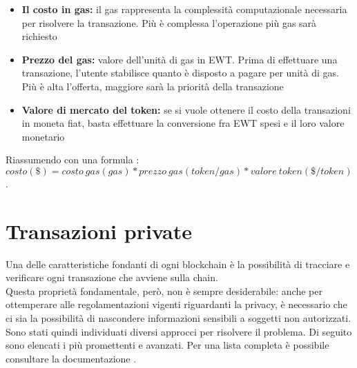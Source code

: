 \begin{itemize}
    \item \textbf{Il costo in gas:} il gas rappresenta la complessità computazionale necessaria per risolvere la transazione. Più è complessa l'operazione più gas sarà richiesto
    \item \textbf{Prezzo del gas:} valore dell'unità di gas in EWT. Prima di effettuare una transazione, l'utente stabilisce quanto è disposto a pagare per unità di gas. Più è alta l'offerta, maggiore sarà la priorità della transazione
    \item \textbf{Valore di mercato del token:} se si vuole ottenere il costo della transazioni in moneta fiat, basta effettuare la conversione fra EWT spesi e il loro valore monetario
\end{itemize}

Riassumendo con una formula \cite{wiki:ew-transaction-cost}: \\
$ costo(\$) = costo\ gas(gas) * prezzo\ gas(token/gas) * valore\ token (\$/token) $. 


\section{Transazioni private}
Una delle caratteristiche fondanti di ogni blockchain è la possibilità di tracciare e verificare ogni transazione che avviene sulla chain. \\
Questa proprietà fondamentale, però, non è sempre desiderabile: anche per ottemperare alle regolamentazioni vigenti riguardanti la privacy, è necessario che ci sia la possibilità di nascondere informazioni sensibili a soggetti non autorizzati. \\
Sono stati quindi individuati diversi approcci per risolvere il problema.
Di seguito sono elencati i più promettenti e avanzati.
Per una lista completa è possibile consultare la documentazione \cite{wiki:ew-privacy}.

